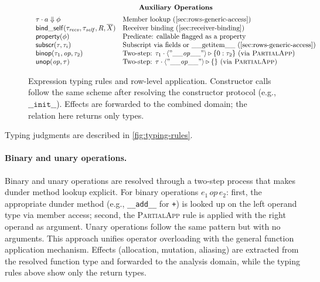 \begin{figure*}[t]
\[\begin{array}{c}
\textbf{Auxiliary Operations} \\[0.5em]
\begin{array}{ll}
\tau \cdot a \Downarrow \phi & \text{Member lookup (\autoref{sec:rows-generic-access})} \\
\mathsf{bind\_self}(\tau_{\mathit{recv}}, \tau_{\mathit{self}}, R, \overline{X}) & \text{Receiver binding (\autoref{sec:receiver-binding})} \\
\mathsf{property}(\phi) & \text{Predicate: callable flagged as a property} \\
\mathsf{subscr}(\tau, \tau_i) & \text{Subscript via fields or \_\_getitem\_\_ (\autoref{sec:rows-generic-access})} \\
\mathsf{binop}(\tau_1, \mathit{op}, \tau_2) & \text{Two-step: } \tau_1 \cdot \langle\mathtt{"\_\_}\mathit{op}\mathtt{\_\_"}\rangle \triangleright \{0:\tau_2\} \text{ (via \textsc{PartialApp})} \\
\mathsf{unop}(\mathit{op}, \tau) & \text{Two-step: } \tau \cdot \langle\mathtt{"\_\_}\mathit{op}\mathtt{\_\_"}\rangle \triangleright \{\} \text{ (via \textsc{PartialApp})}
\end{array}
\end{array}
\]
\caption{Expression typing rules and row-level application. Constructor calls follow the same scheme after resolving the constructor protocol (e.g., \(\mathtt{\_\_init\_\_}\)). Effects are forwarded to the combined domain; the relation here returns only types.}
\label{fig:typing-rules}
\end{figure*}

Typing judgments are described in \autoref{fig:typing-rules}.

\paragraph{Binary and unary operations.}
Binary and unary operations are resolved through a two-step process that makes dunder method lookup explicit. For binary operations $e_1 \mathit{\,op\,} e_2$: first, the appropriate dunder method (e.g., \texttt{\_\_add\_\_} for \texttt{+}) is looked up on the left operand type via member access; second, the \textsc{PartialApp} rule is applied with the right operand as argument. Unary operations follow the same pattern but with no arguments. This approach unifies operator overloading with the general function application mechanism. Effects (allocation, mutation, aliasing) are extracted from the resolved function type and forwarded to the analysis domain, while the typing rules above show only the return types.

